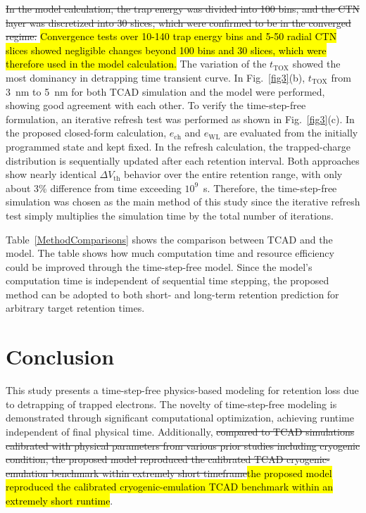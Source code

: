 \documentclass[journal,twoside,web]{ieeecolor}
\begin{document}
\sout{In the model calculation, the trap energy was divided into 100 bins, and the CTN layer was discretized into 30 slices{, which were confirmed to be in the converged regime}.}
\hl{Convergence tests over 10-140 trap energy bins and 5-50 radial CTN slices showed negligible changes beyond 100 bins and 30 slices, which were therefore used in the model calculation.}
The variation of the $t_\text{TOX}$ showed the most dominancy in detrapping time transient curve.
In Fig.~\ref{fig3}(b), $t_\text{TOX}$ from 3~nm to 5~nm for both TCAD simulation and the model were performed, showing good {agreement} with each other.
{To verify the time-step-free formulation, an iterative refresh test was performed as shown in Fig.~\hbox{\ref{fig3}(c)}.}
{In the proposed closed-form calculation, $e_\mathrm{ch}$ and $e_\mathrm{WL}$ are evaluated from the initially programmed state and kept fixed.}
{In the refresh calculation, the trapped-charge distribution is sequentially updated after each retention interval.}
{Both approaches show nearly identical $\Delta V_\text{th}$ behavior over the entire retention range, with only about 3\% difference from time exceeding $10^9$~s.}
{Therefore, the time-step-free simulation was chosen as the main method of this study since the iterative refresh test simply multiplies the simulation time by the total number of iterations.}

Table~\ref{MethodComparisons} shows the comparison between TCAD and the model.
The table shows how much computation time and resource efficiency could be improved through the time-step-free model.
Since the model's computation time is independent {of} sequential time {stepping, the proposed method} can be adopted to both short- and long-term retention {prediction for arbitrary target retention times}.

\section{Conclusion}
This study presents a time-step-free physics-based modeling for retention loss due to detrapping of trapped electrons. 
The novelty of time-step-free modeling is demonstrated through significant computational optimization, achieving runtime independent of final physical time.
Additionally, \sout{compared to TCAD simulations calibrated with physical parameters from various prior studies including cryogenic condition, the proposed model {reproduced the calibrated TCAD cryogenic-emulation benchmark} within extremely short timeframe}\hl{the proposed model reproduced the calibrated cryogenic-emulation TCAD benchmark within an extremely short runtime}. 
\end{document}
